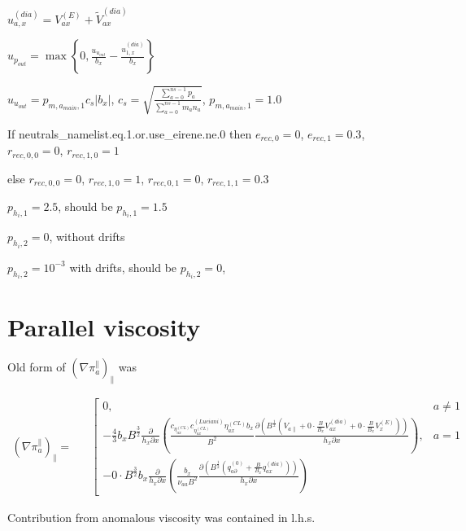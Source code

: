 \documentclass[a4paper,10pt]{report}
\begin{document}
$u_{a,x}^{(dia)} = V_{ax}^{(E)} + \widetilde V_{ax}^{(dia)}$

$u_{p_{out}} = \max \left\{
	0, \frac{u_{u_{out}}}{b_x} - \frac{u_{1,x}^{(dia)}}{b_x}
\right\}$

$u_{u_{out}} = p_{m,a_{main},1} c_s |b_x|$, $c_s = \sqrt{\frac{\sum \limits_{a=0}^{ns-1} p_a}{\sum \limits_{a=0}^{ns-1} m_a n_a}}$, $p_{m,a_{main},1} = 1.0$

If neutrals\_namelist.eq.1.or.use\_eirene.ne.0
then $e_{rec,0} = 0$, $e_{rec,1} = 0.3$, $r_{rec,0,0} = 0$, $r_{rec,1,0} = 1$

else  $r_{rec,0,0} = 0$, $r_{rec,1,0} = 1$, $r_{rec,0,1} = 0$, $r_{rec,1,1} = 0.3$

$p_{h_i,1} = 2.5$, should be $p_{h_i,1} = 1.5$

$p_{h_i,2} = 0$, without drifts

$p_{h_i,2} = 10^{-3}$ with drifts, should be $p_{h_i,2} =0$,

\section{Parallel viscosity}

Old form of  $\left( \nabla \pi_a^{\parallel}\right)_{\parallel}$ was

\begin{equation*}
\begin{matrix}
\left( \nabla \pi_a^{\parallel}\right)_{\parallel} = &
& \left[
\begin{matrix}
0, & a \neq 1\\

-\frac 4 3 b_x B^{\frac 3 2} \frac{\partial}{h_x \partial x} \left(
	\frac{
		c_{\eta_{ax}^{(CL)}} c_{\eta_{ax}^{(CL)}}^{(Luciani)} \eta^{(CL)}_{ax} b_x
	}{B^2}
	\frac{
		\partial \left(
			B^{\frac 1 2} \left(
				V_{a \parallel} + 0 \cdot \frac	B{B_x} V_{ax}^{(dia)} + 0 \cdot \frac B{B_x} V_x^{(E)}
			\right)
		\right)
	}{h_x\partial x}
\right)
, & a = 1\\

-0 \cdot B^{\frac 3 2} b_x \frac{\partial }{h_x \partial x} \left(
	\frac{b_x}{\nu_{aa} B^2}
	\frac{\partial \left(
		B^{\frac 1 2} \left(q_{a \partial}^{(0)} + \frac B{B_x} q_{ax}^{(dia)} \right)
	\right)}{h_x\partial x}
\right)
\end{matrix} \right.
\end{matrix}
\end{equation*}

Contribution from anomalous viscosity was contained in l.h.s.
\end{document}
